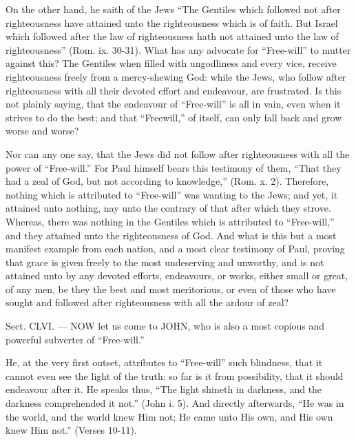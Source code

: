 On the other hand, he saith of the Jews “The Gentiles which followed not after righteousness have attained unto the righteousness which is of faith. But Israel which followed after the law of righteousness hath not attained unto the law of righteousness” (Rom. ix. 30-31). What has any advocate for “Free-will” to mutter against this? The Gentiles when filled with ungodliness and every vice, receive righteousness freely from a mercy-shewing God: while the Jews, who follow after righteousness with all their devoted effort and endeavour, are frustrated. Is this not plainly saying, that the endeavour of “Free-will” is all in vain, even when it strives to do the best; and that “Freewill,” of itself, can only fall back and grow worse and worse?

Nor can any one say, that the Jews did not follow after righteousness with all the power of “Free-will.” For Paul himself bears this testimony of them, “That they had a zeal of God, but not according to knowledge,” (Rom. x. 2). Therefore, nothing which is attributed to “Free-will” was wanting to the Jews; and yet, it attained unto nothing, nay unto the contrary of that after which they strove. Whereas, there was nothing in the Gentiles which is attributed to “Free-will,” and they attained unto the righteousness of God. And what is this but a most manifest example from each nation, and a most clear testimony of Paul, proving that grace is given freely to the most undeserving and unworthy, and is not attained unto by any devoted efforts, endeavours, or works, either small or great, of any men, be they the best and most meritorious, or even of those who have sought and followed after righteousness with all the ardour of zeal?


Sect. CLVI. — NOW let us come to \textsc{JOHN}, who is also a most copious and powerful subverter of “Free-will.”

He, at the very first outset, attributes to “Free-will” such blindness, that it cannot even see the light of the truth: so far is it from possibility, that it should endeavour after it. He speaks thus, “The light shineth in darkness, and the darkness comprehended it not.” (John i. 5). And directly afterwards, “He was in the world, and the world knew Him not; He came unto His own, and His own knew Him not.” (Verses 10-11).

